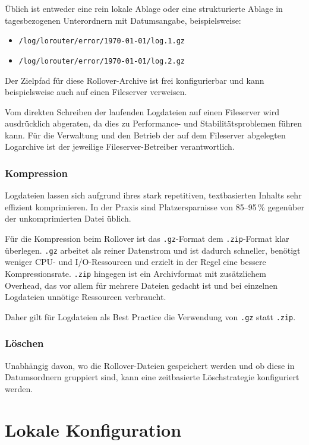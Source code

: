 Üblich ist entweder eine rein lokale Ablage oder eine strukturierte Ablage in tagesbezogenen Unterordnern mit Datumsangabe, beispielsweise:

\begin{itemize}
	\item \texttt{/log/lorouter/error/1970-01-01/log.1.gz}
	\item \texttt{/log/lorouter/error/1970-01-01/log.2.gz}
\end{itemize}

Der Zielpfad für diese Rollover-Archive ist frei konfigurierbar und kann beispielsweise auch auf einen Fileserver verweisen.

Vom direkten Schreiben der laufenden Logdateien auf einen Fileserver wird ausdrücklich abgeraten, da dies zu Performance- und Stabilitätsproblemen führen kann.
Für die Verwaltung und den Betrieb der auf dem Fileserver abgelegten Logarchive ist der jeweilige Fileserver-Betreiber verantwortlich.

\subsubsection{Kompression}

Logdateien lassen sich aufgrund ihres stark repetitiven, textbasierten Inhalts sehr effizient komprimieren. In der Praxis sind Platzersparnisse von 85--95\,\% gegenüber der unkomprimierten Datei üblich.

Für die Kompression beim Rollover ist das \texttt{.gz}-Format dem \texttt{.zip}-Format klar überlegen. \texttt{.gz} arbeitet als reiner Datenstrom und ist dadurch schneller, benötigt weniger CPU- und I/O-Ressourcen und erzielt in der Regel eine bessere Kompressionsrate. \texttt{.zip} hingegen ist ein Archivformat mit zusätzlichem Overhead, das vor allem für mehrere Dateien gedacht ist und bei einzelnen Logdateien unnötige Ressourcen verbraucht.

Daher gilt für Logdateien als Best Practice die Verwendung von \texttt{.gz} statt \texttt{.zip}.

\subsubsection{Löschen}

Unabhängig davon, wo die Rollover-Dateien gespeichert werden und ob diese in Datumsordnern gruppiert sind, kann eine zeitbasierte Löschstrategie konfiguriert werden.

\section{Lokale Konfiguration}

